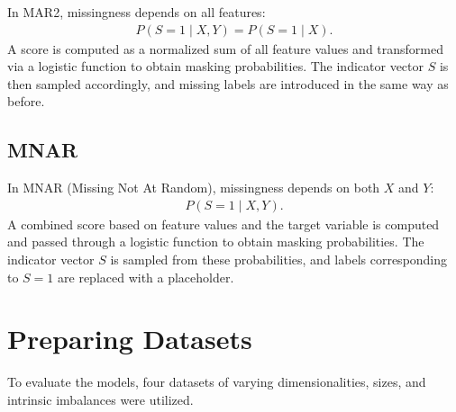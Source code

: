 \documentclass[12pt,a4paper]{article}
\begin{document}
In MAR2, missingness depends on all features:
\begin{align*}
    P(S = 1 \mid X, Y) = P(S = 1 \mid X).
\end{align*}
A score is computed as a normalized sum of all feature values and transformed via a logistic function to obtain masking probabilities. The indicator vector $S$ is then sampled accordingly, and missing labels are introduced in the same way as before.

\subsection{MNAR}

In MNAR (Missing Not At Random), missingness depends on both $X$ and $Y$:
\begin{align*}
    P(S = 1 \mid X, Y).
\end{align*}
A combined score based on feature values and the target variable is computed and passed through a logistic function to obtain masking probabilities. The indicator vector $S$ is sampled from these probabilities, and labels corresponding to $S=1$ are replaced with a placeholder.

\newpage
\section{Preparing Datasets}

To evaluate the models, four datasets of varying dimensionalities, sizes, and intrinsic imbalances were utilized.
\end{document}
